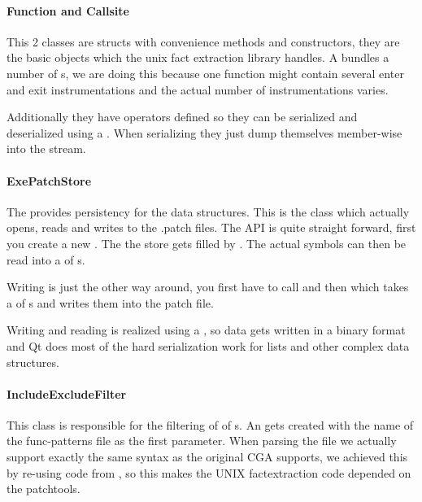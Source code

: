 \paragraph{Function and Callsite}

This 2 classes are structs with convenience methods and constructors, they are the basic objects which the unix fact extraction library handles.  A  bundles a number of s, we are doing this because one function might contain several enter and exit instrumentations and the actual number of instrumentations varies.

Additionally they have operators defined so they can be serialized and deserialized using a .  When serializing they just dump themselves member-wise into the stream.

\paragraph{ExePatchStore}

The  provides persistency for the data structures.  This is the class which actually opens, reads and writes to the .patch files.  The API is quite straight forward, first you create a new .  The the store gets filled by .  The actual symbols can then be read into a  of s.

Writing is just the other way around, you first have to call  and then  which takes a  of s and writes them into the patch file.

Writing and reading is realized using a , so data gets written in a binary format and Qt does most of the hard serialization work for lists and other complex data structures.

\paragraph{IncludeExcludeFilter}

This class is responsible for the filtering of  of s.   An  gets created with the name of the func-patterns file as the first parameter.  When parsing the file we actually support exactly the same syntax as the original CGA supports, we achieved this by re-using code from , so this makes the UNIX factextraction code depended on the patchtools.

